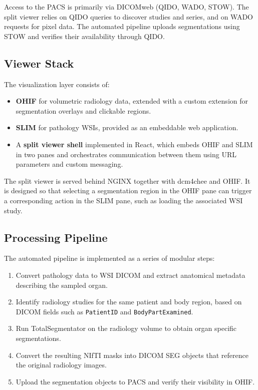 \documentclass[11pt,a4paper]{article}
\begin{document}
Access to the PACS is primarily via DICOMweb (QIDO, WADO, STOW). The split viewer relies on QIDO queries to discover studies and series, and on WADO requests for pixel data. The automated pipeline uploads segmentations using STOW and verifies their availability through QIDO.

\subsection{Viewer Stack}

The visualization layer consists of:
\begin{itemize}
    \item \textbf{OHIF} for volumetric radiology data, extended with a custom extension for segmentation overlays and clickable regions.
    \item \textbf{SLIM} for pathology WSIs, provided as an embeddable web application.
    \item A \textbf{split viewer shell} implemented in React, which embeds OHIF and SLIM in two panes and orchestrates communication between them using URL parameters and custom messaging.
\end{itemize}

The split viewer is served behind NGINX together with dcm4chee and OHIF. It is designed so that selecting a segmentation region in the OHIF pane can trigger a corresponding action in the SLIM pane, such as loading the associated WSI study.

\subsection{Processing Pipeline}

The automated pipeline is implemented as a series of modular steps:
\begin{enumerate}
    \item Convert pathology data to WSI DICOM and extract anatomical metadata describing the sampled organ.
    \item Identify radiology studies for the same patient and body region, based on DICOM fields such as \texttt{PatientID} and \texttt{BodyPartExamined}.
    \item Run TotalSegmentator on the radiology volume to obtain organ specific segmentations.
    \item Convert the resulting NIfTI masks into DICOM SEG objects that reference the original radiology images.
    \item Upload the segmentation objects to PACS and verify their visibility in OHIF.
\end{enumerate}
\end{document}
